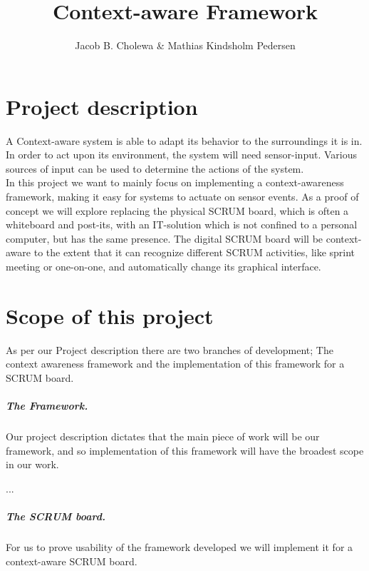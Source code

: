 \documentclass[]{report}
\title{Context-aware Framework}
\author{Jacob B. Cholewa \& Mathias Kindsholm Pedersen}
\begin{document}
\graphicspath{{img/}{../img/}}
\maketitle

\begin{abstract}
\end{abstract}


\chapter{Project description}
A Context-aware system is able to adapt its behavior to the surroundings it is in. In order to act upon its environment, the system will need sensor-input. Various sources of input can be used to determine the actions of the system.\\

In this project we want to mainly focus on implementing a context-awareness framework, making it easy for systems to actuate on sensor events. As a proof of concept we will explore replacing the physical SCRUM board, which is often a whiteboard and post-its, with an IT-solution which is not confined to a personal computer, but has the same presence. The digital SCRUM board will be context-aware to the extent that it can recognize different SCRUM activities, like sprint meeting or one-on-one, and automatically change its graphical interface.


\chapter{Scope of this project}

As per our Project description there are two branches of development; The context awareness framework and the implementation of this framework for a SCRUM board.

\paragraph{The Framework.} Our project description dictates that the main piece of work will be our framework, and so implementation of this framework will have the broadest scope in our work.

...

\paragraph{The SCRUM board.} For us to prove usability of the framework developed we will implement it for a context-aware SCRUM board.
\end{document}
